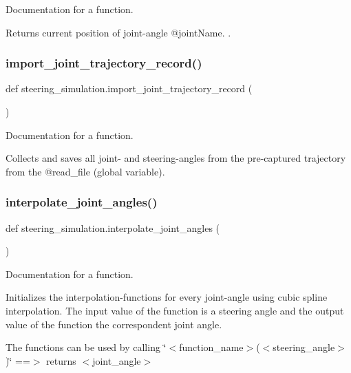 Documentation for a function. 

Returns current position of joint-\/angle @joint\+Name. . \mbox{\label{namespacesteering__simulation_a628f6027d970db8d4071e5846de522fc}} 
\subsubsection{\texorpdfstring{import\_joint\_trajectory\_record()}{import\_joint\_trajectory\_record()}}
{\footnotesize\ttfamily def steering\+\_\+simulation.\+import\+\_\+joint\+\_\+trajectory\+\_\+record (\begin{DoxyParamCaption}{ }\end{DoxyParamCaption})}



Documentation for a function. 

Collects and saves all joint-\/ and steering-\/angles from the pre-\/captured trajectory from the @read\+\_\+file (global variable). \mbox{\label{namespacesteering__simulation_a6e3b1fe25edfbec1713a6bd3ef2a445e}} 
\subsubsection{\texorpdfstring{interpolate\_joint\_angles()}{interpolate\_joint\_angles()}}
{\footnotesize\ttfamily def steering\+\_\+simulation.\+interpolate\+\_\+joint\+\_\+angles (\begin{DoxyParamCaption}{ }\end{DoxyParamCaption})}



Documentation for a function. 

Initializes the interpolation-\/functions for every joint-\/angle using cubic spline interpolation. The input value of the function is a steering angle and the output value of the function the correspondent joint angle.

The functions can be used by calling \char`\"{}$<$function\+\_\+name$>$($<$steering\+\_\+angle$>$)\char`\"{} ==$>$ returns $<$joint\+\_\+angle$>$ \mbox{\label{namespacesteering__simulation_a04ebcaad2fa2cbdb0fd13fdb179d0f50}} 
